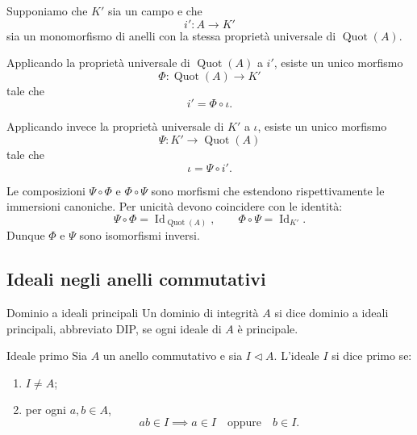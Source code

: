 \documentclass[a4paper]{article}
\begin{document}
\begin{radioactive}
\begin{snippetproof}{}
    Supponiamo che \(K'\) sia un campo e che
    \[
        i'\colon A\to K'
    \]
    sia un monomorfismo di anelli con la stessa proprietà universale di \(\operatorname{Quot}(A)\).

    Applicando la proprietà universale di \(\operatorname{Quot}(A)\) a \(i'\), esiste un unico morfismo
    \[
        \Phi\colon \operatorname{Quot}(A)\to K'
    \]
    tale che
    \[
        i'=\Phi\circ \iota.
    \]

    Applicando invece la proprietà universale di \(K'\) a \(\iota\), esiste un unico morfismo
    \[
        \Psi\colon K'\to \operatorname{Quot}(A)
    \]
    tale che
    \[
        \iota=\Psi\circ i'.
    \]

    Le composizioni \(\Psi\circ \Phi\) e \(\Phi\circ \Psi\) sono morfismi che estendono rispettivamente le immersioni canoniche. Per unicità devono coincidere con le identità:
    \[
        \Psi\circ \Phi=\operatorname{Id}_{\operatorname{Quot}(A)},
        \qquad
        \Phi\circ \Psi=\operatorname{Id}_{K'}.
    \]
    Dunque \(\Phi\) e \(\Psi\) sono isomorfismi inversi.
\end{snippetproof}
\end{radioactive}

\subsection{Ideali negli anelli commutativi}

\begin{radioactive}
\begin{snippetdefinition}{Dominio a ideali principali}
    Un dominio di integrità \(A\) si dice dominio a ideali principali, abbreviato DIP, se ogni ideale di \(A\) è principale.
\end{snippetdefinition}
\end{radioactive}

\begin{radioactive}
\begin{snippetdefinition}{Ideale primo}
    Sia \(A\) un anello commutativo e sia \(I\triangleleft A\).
    L'ideale \(I\) si dice primo se:
    \begin{enumerate}
        \item \(I\neq A\);
        \item per ogni \(a,b\in A\),
        \[
            ab\in I
            \implies
            a\in I
            \quad
            \text{oppure}
            \quad
            b\in I.
        \]
    \end{enumerate}
\end{snippetdefinition}
\end{radioactive}
\end{document}

